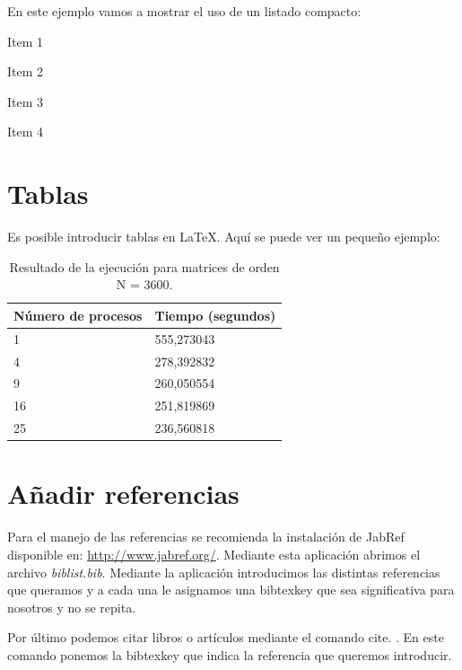 \documentclass[11pt]{article}
\begin{document}
En este ejemplo vamos a mostrar el uso de un listado compacto:

\begin{compactitem}
	\item Item 1
	\item Item 2
	\item Item 3
	\item Item 4
\end{compactitem}


\section{Tablas}
Es posible introducir tablas en \LaTeX{}. Aquí se puede ver un pequeño ejemplo:

\begin{table}[htbp]
	\begin{center}
		\begin{tabular}{|l|l|}
			\hline
			Número de procesos & Tiempo (segundos) \\
			\hline \hline
			1 & 555,273043 \\ \hline
			4 & 278,392832 \\ \hline
			9 & 260,050554 \\ \hline
			16 & 251,819869 \\ \hline
			25 & 236,560818 \\ \hline
		\end{tabular}
		\caption{Resultado de la ejecución para matrices de orden N = 3600.}
		\label{tabla:Tiempos3600}
	\end{center}
\end{table}


\section{Añadir referencias}
Para el manejo de las referencias se recomienda la instalación de JabRef disponible en: \url{http://www.jabref.org/}. Mediante esta aplicación abrimos el archivo \emph{biblist.bib}. Mediante la aplicación introducimos las distintas referencias que queramos y a cada una le asignamos una bibtexkey que sea significativa para nosotros y no se repita.

Por último podemos citar libros o artículos mediante el comando cite. \cite{Kottwitz2011} \cite{Martin2017} \cite{Salido2011}. En este comando ponemos la bibtexkey que indica la referencia que queremos introducir.


\end{document}
